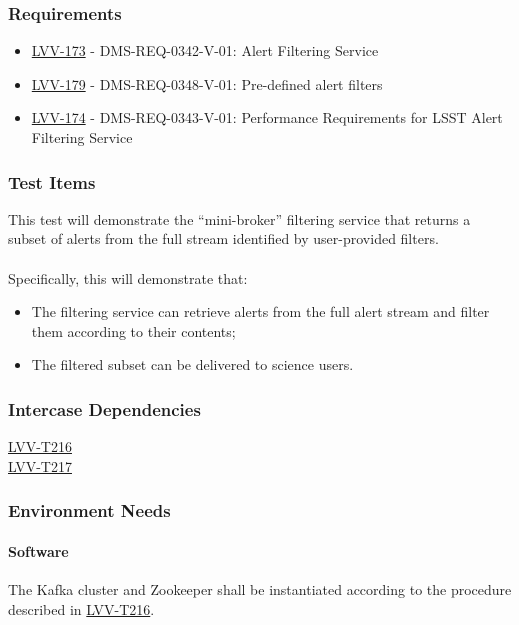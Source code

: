 \subsubsection{Requirements}
\begin{itemize}
\item \href{https://jira.lsstcorp.org/browse/LVV-173}{LVV-173} - DMS-REQ-0342-V-01: Alert Filtering Service
\item \href{https://jira.lsstcorp.org/browse/LVV-179}{LVV-179} - DMS-REQ-0348-V-01: Pre-defined alert filters
\item \href{https://jira.lsstcorp.org/browse/LVV-174}{LVV-174} - DMS-REQ-0343-V-01: Performance Requirements for LSST Alert Filtering Service
\end{itemize}

\subsubsection{Test Items}
This test will demonstrate the ``mini-broker'' filtering service that
returns a subset of alerts from the full stream identified by
user-provided filters.\\
~\\
Specifically, this will demonstrate that:\\

\begin{itemize}
\tightlist
\item
  The filtering service can retrieve alerts from the full alert stream
  and filter them according to their contents; ~ ~
\item
  The filtered subset can be delivered to science users.
\end{itemize}



\subsubsection{Intercase Dependencies}
​\href{https://jira.lsstcorp.org/secure/Tests.jspa\#/testCase/LVV-T216}{LVV-T216}​​​\\
​\href{https://jira.lsstcorp.org/secure/Tests.jspa\#/testCase/LVV-T217}{LVV-T217}​​​


\subsubsection{Environment Needs}

\paragraph{Software}
The Kafka cluster and Zookeeper shall be instantiated according to the
procedure described in
\href{https://jira.lsstcorp.org/secure/Tests.jspa\#/testCase/LVV-T216}{LVV-T216}.


